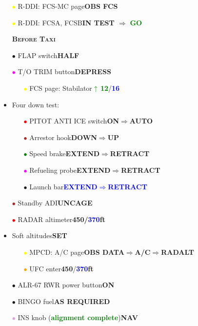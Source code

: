 \documentclass[a4paper,12pt,dvipsnames]{letter}
\newcommand{\button}[1]{\textbf{#1}}
\newcommand{\ok}[1]{\textcolor{Green}{\textbf{#1}}}
\newcommand{\boat}[1]{\textcolor{Blue}{\textbf{#1}}}
\newcommand{\myHead}[1]{{\LARGE\textsc{\textbf{#1}}}}
\newcommand{\bi}{\textcolor{ProcessBlue}{$\bullet$\;}}
\newcommand{\ri}{\textcolor{Red}{$\bullet$\;}}
\newcommand{\gi}{\textcolor{Green}{$\bullet$\;}}
\newcommand{\yi}{\textcolor{Yellow}{$\bullet$\;}}
\newcommand{\vi}{\textcolor{Plum}{$\bullet$\;}}
\newcommand{\mi}{\textcolor{Magenta}{$\bullet$\;}}
\newcommand{\oi}{\textcolor{Orange}{$\bullet$\;}}
\newcommand{\ai}{\textcolor{Apricot}{$\bullet$\;}}
\renewcommand{\ni}{\textcolor{Brown}{$\bullet$\;}}
\begin{document}
{\begin{itemize}
\begin{itemize}
  \item[\yi] R-DDI: FCS-MC page\dotfill\button{OBS FCS}
  \item[\yi] R-DDI: FCSA, FCSB\dotfill\button{IN TEST $\Rightarrow$ }\ok{GO}
 \end{itemize}
\end{itemize} 
\newpage
\begin{itemize}
 \item[] \myHead{Before Taxi}
 \item[\bi] FLAP switch\dotfill\button{HALF}
 \item[\mi] T/O TRIM button\dotfill\button{DEPRESS}
 \begin{itemize}
  \item[\yi] FCS page: Stabilator\dotfill\ok{$\mathbf{\uparrow}$\,12\textdegree}/\boat{16\textdegree}
 \end{itemize}
 \item Four down test:
 \begin{itemize}
  \item[\ri] PITOT ANTI ICE switch\dotfill\button{ON\;$\Rightarrow$\;AUTO}
  \item[\ni] Arrestor hook\dotfill\button{DOWN\;$\Rightarrow$\;UP}
  \item[\gi] Speed brake\dotfill\button{EXTEND\;$\Rightarrow$\;RETRACT}
  \item[\mi] Refueling probe\dotfill\button{EXTEND\;$\Rightarrow$\;RETRACT}
  \item[\bi] Launch bar\dotfill\boat{EXTEND\;$\Rightarrow$\;RETRACT}
 \end{itemize}
 \item[\ni] Standby ADI\dotfill\button{UNCAGE}
 \item[\ri] RADAR altimeter\dotfill\button{450/\boat{370}\;ft}
 \item Soft altitudes\dotfill\button{SET}
 \begin{itemize}
  \item[\yi] MPCD: A/C page\dotfill\button{OBS DATA\;$\Rightarrow$\;A/C\;$\Rightarrow$\;RADALT}
  \item[\oi] UFC enter\dotfill\button{450}/\boat{370}\button{\;ft}
 \end{itemize}
 \item[\ai] ALR-67 RWR power button\dotfill\button{ON}
 \item[\bi] BINGO fuel\dotfill\button{AS REQUIRED}
 \item[\vi] INS knob (\ok{alignment complete})\dotfill\button{NAV}

\end{itemize}}
\end{document}
